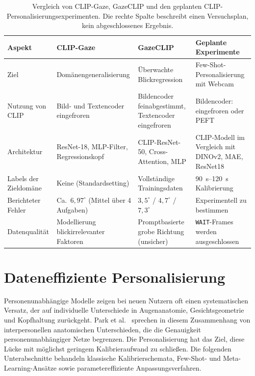 \documentclass[
  11pt,
  a4paper,
  oneside,
  DIV=12,                 %
  BCOR=8mm,               %
  parskip=half,           %
  headings=normal,
  bibliography=totoc,     %
  listof=totoc            %
]{scrreprt}
\newcommand{\code}[1]{\texttt{#1}}
\begin{document}
\begin{table}[htbp]
  \centering
  \small
  \caption{Vergleich von CLIP-Gaze, GazeCLIP und den geplanten CLIP-Personalisierungsexperimenten. Die rechte Spalte beschreibt einen Versuchsplan, kein abgeschlossenes Ergebnis.}
  \label{tab:clip_vergleich}
  \begin{tabularx}{\textwidth}{L{2.6cm} Y Y Y}
    \toprule
    \textbf{Aspekt} & \textbf{CLIP-Gaze~\cite{yin2024clipgaze}} & \textbf{GazeCLIP~\cite{wang2026gazeclip}} & \textbf{Geplante Experimente} \\
    \midrule
    Ziel & Domänengeneralisierung & Überwachte Blickregression & Few-Shot-Personalisierung mit Webcam \\
    Nutzung von CLIP & Bild- und Textencoder eingefroren & Bildencoder feinabgestimmt, Textencoder eingefroren & Bildencoder: eingefroren oder PEFT \\
    Architektur & ResNet-18, MLP-Filter, Regressionskopf & CLIP-ResNet-50, Cross-Attention, MLP & CLIP-Modell im Vergleich mit DINOv2, MAE, ResNet18 \\
    Labels der Zieldomäne & Keine (Standardsetting) & Vollständige Trainingsdaten & \SIrange{90}{120}{\second} Kalibrierung \\
    Berichteter Fehler & Ca.\ $6,97^\circ$ (Mittel über 4 Aufgaben) & $3,5^\circ$ / $4,7^\circ$ / $7,3^\circ$ & Experimentell zu bestimmen \\
    Datenqualität & Modellierung blickirrelevanter Faktoren & Promptbasierte grobe Richtung (unsicher) & \code{WAIT}-Frames werden ausgeschlossen \\
    \bottomrule
  \end{tabularx}
\end{table}

\section{Dateneffiziente Personalisierung}
\label{sec:personalisierung}
Personenunabhängige Modelle zeigen bei neuen Nutzern oft einen systematischen Versatz, der auf individuelle Unterschiede in Augenanatomie, Gesichtsgeometrie und Kopfhaltung zurückgeht. Park et al.~\cite{park2019faze} sprechen in diesem Zusammenhang von interpersonellen anatomischen Unterschieden, die die Genauigkeit personenunabhängiger Netze begrenzen. Die Personalisierung hat das Ziel, diese Lücke mit möglichst geringem Kalibrieraufwand zu schließen. Die folgenden Unterabschnitte behandeln klassische Kalibrierschemata, Few-Shot- und Meta-Learning-Ansätze sowie parametereffiziente Anpassungsverfahren.
\end{document}
